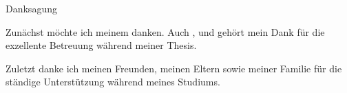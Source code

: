 \thispagestyle{empty}
\begin{center}
\large \lsstyle
Danksagung
\end{center}
\vspace{1.5cm}
Zunächst möchte ich meinem \betreuerhs{} danken. Auch \betreuerbeta{}, \betreuerbetc{} und \betreuerbetb{} gehört mein Dank für die exzellente Betreuung während meiner Thesis. 

Zuletzt danke ich meinen Freunden, meinen Eltern sowie meiner Familie für die ständige Unterstützung während meines Studiums.